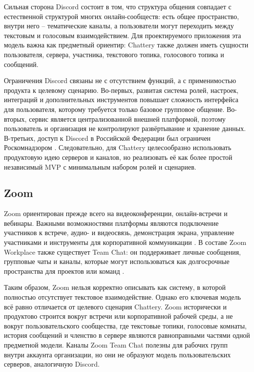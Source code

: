 \documentclass[a4paper,12pt]{extarticle}
\begin{document}
Сильная сторона Discord состоит в том, что структура общения совпадает с естественной структурой многих онлайн-сообществ: есть общее пространство, внутри него -- тематические каналы, а пользователи могут переходить между текстовым и голосовым взаимодействием. Для проектируемого приложения эта модель важна как предметный ориентир: Chattery также должен иметь сущности пользователя, сервера, участника, текстового топика, голосового топика и сообщений.

Ограничения Discord связаны не с отсутствием функций, а с применимостью продукта к целевому сценарию. Во-первых, развитая система ролей, настроек, интеграций и дополнительных инструментов повышает сложность интерфейса для пользователя, которому требуется только базовое групповое общение. Во-вторых, сервис является централизованной внешней платформой, поэтому пользователь и организация не контролируют развёртывание и хранение данных. В-третьих, доступ к Discord в Российской Федерации был ограничен Роскомнадзором \cite{discord_russia}. Следовательно, для Chattery целесообразно использовать продуктовую идею серверов и каналов, но реализовать её как более простой независимый MVP с минимальным набором ролей и сценариев.

\subsection{Zoom}

Zoom ориентирован прежде всего на видеоконференции, онлайн-встречи и вебинары. Важными возможностями платформы являются подключение участников к встрече, аудио- и видеосвязь, демонстрация экрана, управление участниками и инструменты для корпоративной коммуникации \cite{zoom}. В составе Zoom Workplace также существует Team Chat: он поддерживает личные сообщения, групповые чаты и каналы, которые могут использоваться как долгосрочные пространства для проектов или команд \cite{zoom_chat}.

Таким образом, Zoom нельзя корректно описывать как систему, в которой полностью отсутствует текстовое взаимодействие. Однако его ключевая модель всё равно отличается от целевого сценария Chattery. Zoom исторически и продуктово строится вокруг встречи или корпоративной рабочей среды, а не вокруг пользовательского сообщества, где текстовые топики, голосовые комнаты, история сообщений и членство в сервере являются равноправными частями одной предметной модели. Каналы Zoom Team Chat полезны для рабочих групп внутри аккаунта организации, но они не образуют модель пользовательских серверов, аналогичную Discord.
\end{document}
